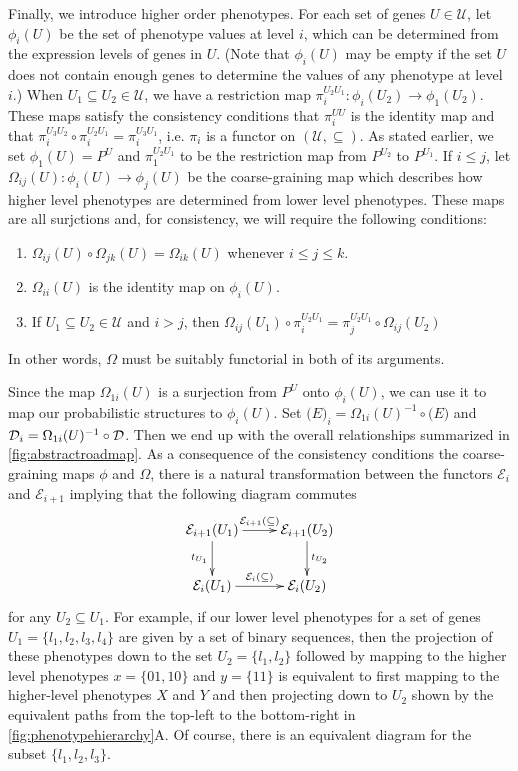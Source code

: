 Finally, we introduce higher order phenotypes.  For each set of genes $U \in \mathcal{U}$, let $\phi_i (U)$ be the set of phenotype values at level $i$, which can be determined from the expression levels of genes in $U$.  (Note that $\phi_i (U)$ may be empty if the set $U$ does not contain enough genes to determine the values of any phenotype at level $i$.)  When $U_1 \subseteq U_2 \in \mathcal{U}$, we have a restriction map $\pi_i^{U_2 U_1} \colon \phi_i(U_2) \to \phi_1(U_2)$.  These maps satisfy the consistency conditions that $\pi_i^{UU}$ is the identity map and that $\pi_i^{U_3 U_2} \circ \pi_i^{U_2 U_1} = \pi_i^{U_3 U_1}$, i.e. $\pi_i$ is a functor on $(\mathcal{U}, \subseteq)$.  As stated earlier, we set $\phi_1 (U) = P^U$ and $\pi_1^{U_2 U_1}$ to be the restriction map from $P^{U_2}$ to $P^{U_1}$.  If $i \le j$, let $\Omega_{ij}(U) : \phi_i(U) \to \phi_j(U)$ be the coarse-graining map which describes how higher level phenotypes are determined from lower level phenotypes.  These maps are all surjctions and, for consistency, we will require the following conditions:
\begin{enumerate}
\item $\Omega_{ij}(U) \circ \Omega_{jk}(U) = \Omega_{ik}(U)$ whenever $i \le j \le k$.
\item $\Omega_{ii}(U)$ is the identity map on $\phi_i (U)$.
\item If $U_1 \subseteq U_2 \in \mathcal{U}$ and $i > j$, then $\Omega_{ij}(U_1) \circ \pi_i^{U_2 U_1} = \pi_j^{U_2 U_1} \circ \Omega_{ij}(U_2)$
\end{enumerate}
In other words, $\Omega$ must be suitably functorial in both of its arguments.

Since the map $\Omega_{1i}(U)$ is a surjection from $P^U$ onto $\phi_i(U)$, we can use it to map our probabilistic structures to $\phi_i(U)$.  Set $\mathcal(E)_i = \Omega_{1i}(U)^{-1} \circ \mathcal(E)$ and $\mathcal{D}_i = \Omega_{1i}(U)^{-1} \circ \mathcal{D}$.  Then we end up with the overall relationships summarized in \ref{fig:abstractroadmap}. As a consequence of the consistency conditions the coarse-graining maps $\phi$ and $\Omega$, there is a natural transformation between the functors $\mathcal{E}_i$ and $\mathcal{E}_{i+1}$ implying that the following diagram commutes
$$
\xymatrix{
\mathcal{E}_{i+1}(U_1) \ar[r]^{\mathcal{E}_{i+1}(\subseteq)} \ar[d]_{t_{U_1}} & \mathcal{E}_{i+1}(U_2) \ar[d]^{t_{U_2}} \\
\mathcal{E}_{i}(U_1) \ar[r]^{\mathcal{E}_{i}(\subseteq)} & \mathcal{E}_{i}(U_2) }
$$
for any $U_2 \subseteq U_1$. For example, if our lower level phenotypes for a set of genes $U_1 = \{ l_1,l_2,l_3,l_4 \}$ are given by a set of binary sequences, then the projection of these phenotypes down to the set $U_2 = \{l_1,l_2\}$ followed by mapping to the higher level phenotypes $x=\{01,10\}$ and $y=\{11\}$ is equivalent to first mapping to the higher-level phenotypes $X$ and $Y$ and then projecting down to $U_2$ shown by the equivalent paths from the top-left to the bottom-right in \ref{fig:phenotypehierarchy}A.
Of course, there is an equivalent diagram for the subset $\{ l_1,l_2,l_3 \}$.

